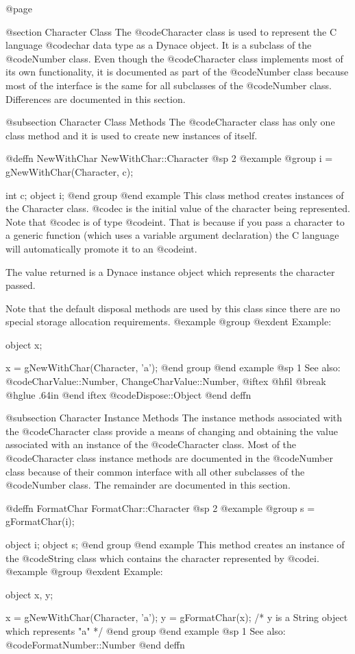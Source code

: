 @page

@section Character Class
The @code{Character} class is used to represent the C language
@code{char} data type as a Dynace object.  It is a subclass of the
@code{Number} class.  Even though the @code{Character} class
implements most of its own functionality, it is documented as part of
the @code{Number} class because most of the interface is the same for
all subclasses of the @code{Number} class.  Differences are documented
in this section.


@subsection Character Class Methods
The @code{Character} class has only one class method and it is used to create
new instances of itself.



@deffn {NewWithChar} NewWithChar::Character
@sp 2
@example
@group
i = gNewWithChar(Character, c);

int     c;
object  i;
@end group
@end example
This class method creates instances of the Character class.  @code{c} is
the initial value of the character being represented.  Note that
@code{c} is of type @code{int}.  That is because if you pass a character
to a generic function (which uses a variable argument declaration) the C
language will automatically promote it to an @code{int}.

The value returned is a Dynace instance object which represents the character
passed.

Note that the default disposal methods are used by this class since
there are no special storage allocation requirements.
@example
@group
@exdent Example:

object  x;

x = gNewWithChar(Character, 'a');
@end group
@end example
@sp 1
See also:  @code{CharValue::Number, ChangeCharValue::Number,}
@iftex
@hfil @break @hglue .64in      
@end iftex
@code{Dispose::Object}
@end deffn





@subsection Character Instance Methods
The instance methods associated with the @code{Character} class provide
a means of changing and obtaining the value associated with an instance
of the @code{Character} class.  Most of the @code{Character} class
instance methods are documented in the @code{Number} class because of
their common interface with all other subclasses of the @code{Number}
class.  The remainder are documented in this section.






@deffn {FormatChar} FormatChar::Character
@sp 2
@example
@group
s = gFormatChar(i);

object  i;
object  s;
@end group
@end example
This method creates an instance of the @code{String} class which
contains the character represented by @code{i}.
@example
@group
@exdent Example:

object  x, y;

x = gNewWithChar(Character, 'a');
y = gFormatChar(x);
/*  y is a String object which represents "a"  */
@end group
@end example
@sp 1
See also:  @code{FormatNumber::Number}
@end deffn







